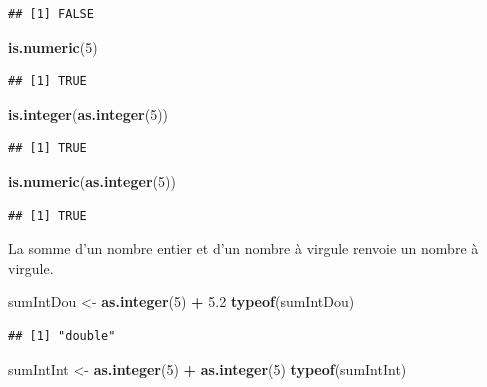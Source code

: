 \documentclass[]{book}
\newenvironment{Shaded}{\begin{snugshade}}{\end{snugshade}}
\newcommand{\KeywordTok}[1]{\textcolor[rgb]{0.13,0.29,0.53}{\textbf{#1}}}
\newcommand{\DecValTok}[1]{\textcolor[rgb]{0.00,0.00,0.81}{#1}}
\newcommand{\FloatTok}[1]{\textcolor[rgb]{0.00,0.00,0.81}{#1}}
\newcommand{\StringTok}[1]{\textcolor[rgb]{0.31,0.60,0.02}{#1}}
\newcommand{\OperatorTok}[1]{\textcolor[rgb]{0.81,0.36,0.00}{\textbf{#1}}}
\newcommand{\NormalTok}[1]{#1}
\begin{document}
\begin{verbatim}
## [1] FALSE
\end{verbatim}

\begin{Shaded}
\begin{Highlighting}[]
\KeywordTok{is.numeric}\NormalTok{(}\DecValTok{5}\NormalTok{)}
\end{Highlighting}
\end{Shaded}

\begin{verbatim}
## [1] TRUE
\end{verbatim}

\begin{Shaded}
\begin{Highlighting}[]
\KeywordTok{is.integer}\NormalTok{(}\KeywordTok{as.integer}\NormalTok{(}\DecValTok{5}\NormalTok{))}
\end{Highlighting}
\end{Shaded}

\begin{verbatim}
## [1] TRUE
\end{verbatim}

\begin{Shaded}
\begin{Highlighting}[]
\KeywordTok{is.numeric}\NormalTok{(}\KeywordTok{as.integer}\NormalTok{(}\DecValTok{5}\NormalTok{))}
\end{Highlighting}
\end{Shaded}

\begin{verbatim}
## [1] TRUE
\end{verbatim}

La somme d'un nombre entier et d'un nombre à virgule renvoie un nombre à
virgule.

\begin{Shaded}
\begin{Highlighting}[]
\NormalTok{sumIntDou <-}\StringTok{ }\KeywordTok{as.integer}\NormalTok{(}\DecValTok{5}\NormalTok{) }\OperatorTok{+}\StringTok{ }\FloatTok{5.2}
\KeywordTok{typeof}\NormalTok{(sumIntDou)}
\end{Highlighting}
\end{Shaded}

\begin{verbatim}
## [1] "double"
\end{verbatim}

\begin{Shaded}
\begin{Highlighting}[]
\NormalTok{sumIntInt <-}\StringTok{ }\KeywordTok{as.integer}\NormalTok{(}\DecValTok{5}\NormalTok{) }\OperatorTok{+}\StringTok{ }\KeywordTok{as.integer}\NormalTok{(}\DecValTok{5}\NormalTok{)}
\KeywordTok{typeof}\NormalTok{(sumIntInt)}
\end{Highlighting}
\end{Shaded}
\end{document}
